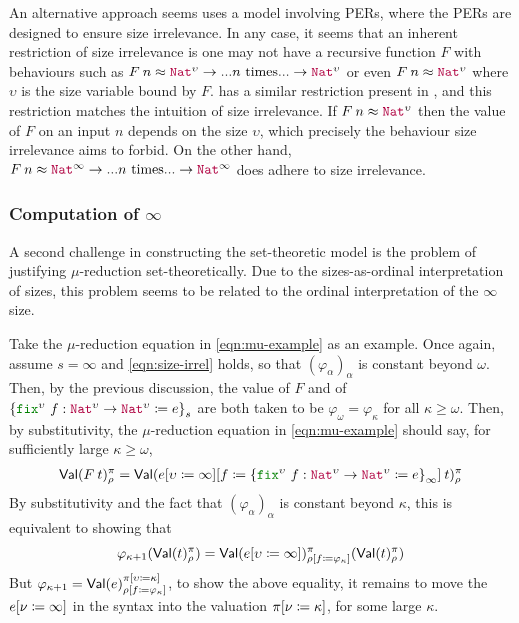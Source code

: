 An alternative approach seems uses a model involving PERs, where the
PERs are designed to ensure size irrelevance.
%
In any case, it seems that an inherent restriction of size irrelevance
is one may not have a recursive function $F$ with behaviours such as
$\app{F}{n} \approx \Nat^\upsilon \to ...n\text{ times}... \to
\Nat^\upsilon$ or even $\app{F}{n} \approx \Nat^\upsilon$ where
$\upsilon$ is the size variable bound by $F$.
%
\citet{cic-hat-minus} has a similar restriction present in
\CIChatminus, and this restriction matches the intuition of
size irrelevance.
%
If $\app{F}{n} \approx \Nat^\upsilon$ then the value of $F$ on an
input $n$ depends on the size $\upsilon$, which precisely the
behaviour size irrelevance aims to forbid.
%
On the other hand, $\app{F}{n} \approx \Nat^\infty \to
...n\text{ times}...\to\Nat^\infty$ does adhere to size irrelevance.

\subsubsection{Computation of $\infty$}\label{sec:infty-compute}
%
A second challenge in constructing the set-theoretic model is the
problem of justifying $\mu$-reduction set-theoretically.
%
Due to the sizes-as-ordinal interpretation of sizes, this problem
seems to be related to the ordinal interpretation of the $\infty$
size.

Take the $\mu$-reduction equation in \eqref{eqn:mu-example} as an
example.
%
Once again, assume $s=\infty$ and \eqref{eqn:size-irrel} holds, so that
$(\varphi_\alpha)_\alpha$ is constant beyond $\omega$.
%
Then, by the previous discussion, the value of $F$ and of
$\left\{\kw{fix}^\upsilon ~ f : \Nat^\upsilon \to \Nat^\upsilon
  \coloneqq e\right\}_{s}$ are both taken to be
$\varphi_\omega = \varphi_{\kappa}$ for all $\kappa \geq \omega$.
%
Then, by substitutivity, the $\mu$-reduction equation in
\eqref{eqn:mu-example} should say, for sufficiently large
$\kappa \geq \omega$,
%
\begin{align*}
  \Val(\app{F}{t})_\rho^\pi =
  \Val(\app{\subst{\subst{e}{\upsilon}{\infty}}{f}{
  \left\{\kw{fix}^\upsilon ~ f : \Nat^\upsilon \to \Nat^\upsilon \coloneqq e\right\}_{\infty}
  }}{t})_\rho^\pi
\end{align*}
%
By substitutivity and the fact that $(\varphi_\alpha)_\alpha$ is
constant beyond $\kappa$, this is equivalent to showing that
%
\begin{align*}
  \varphi_{\kappa+1}(\textsf{Val}(t)_\rho^\pi) =
  \textsf{Val}(e [\upsilon \coloneqq \infty])_{\rho [f \coloneqq \varphi_\kappa]}^{\pi}(\textsf{Val}(t)_\rho^\pi)
\end{align*}
%
But
$\varphi_{\kappa+1} =
\textsf{Val}(e)_{\rho [f \coloneqq \varphi_\kappa]}^{\pi [\upsilon \coloneqq \kappa]}$,
to show the above equality, it remains to move the
$e [\nu \coloneqq \infty]$ in the syntax into the valuation
$\pi [\nu \coloneqq \kappa]$, for some large $\kappa$.

